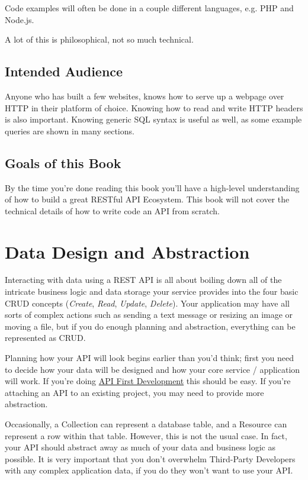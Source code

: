 \documentclass{book}
\begin{document}
Code examples will often be done in a couple different languages, e.g. PHP and Node.js.

A lot of this is philosophical, not so much technical.

\section{Intended Audience}

Anyone who has built a few websites, knows how to serve up a webpage over HTTP in their platform of choice. Knowing how to read and write HTTP headers is also important. Knowing generic SQL syntax is useful as well, as some example queries are shown in many sections.

\section{Goals of this Book}

By the time you're done reading this book you'll have a high-level understanding of how to build a great RESTful API Ecosystem. This book will not cover the technical details of how to write code an API from scratch.


\chapter{Data Design and Abstraction}

Interacting with data using a REST API is all about boiling down all of the intricate business logic and data storage your service provides into the four basic CRUD concepts (\emph{Create}, \emph{Read}, \emph{Update}, \emph{Delete}). Your application may have all sorts of complex actions such as sending a text message or resizing an image or moving a file, but if you do enough planning and abstraction, everything can be represented as CRUD.

Planning how your API will look begins earlier than you'd think; first you need to decide how your data will be designed and how your core service / application will work. If you're doing \href{http://blog.pop.co/post/67465239611/why-we-chose-api-first-development}{API First Development} this should be easy. If you're attaching an API to an existing project, you may need to provide more abstraction.

Occasionally, a Collection can represent a database table, and a Resource can represent a row within that table. However, this is not the usual case. In fact, your API should abstract away as much of your data and business logic as possible. It is very important that you don't overwhelm Third-Party Developers with any complex application data, if you do they won't want to use your API.
\end{document}
